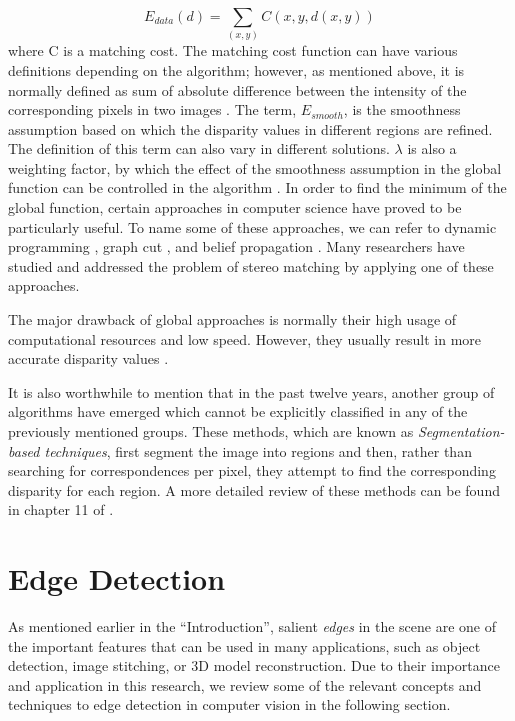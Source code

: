 \begin{equation}
E_{data}(d) = \sum_{(x,y)}C(x,y,d(x,y))
\end{equation}
\noindent
where C is a matching cost. The matching cost function can have various definitions depending on the algorithm; however, as mentioned above, it is normally defined as sum of absolute difference 
between the intensity of the corresponding pixels in two images \cite{sch02}. \newline
The term, $E_{smooth}$, is the smoothness assumption based on which the disparity values in different regions are refined. The definition of this term can also vary in 
different solutions. $\lambda$ is also a weighting factor, by which the effect of the smoothness assumption in the global function can be controlled in the algorithm \cite{sze11}.
In order to find the minimum of the global function, certain approaches in computer science have proved to be particularly useful. 
To name some of these approaches, we can refer to dynamic programming \cite{kim05}, graph cut \cite{boy01,boyk01,boy04}, and belief propagation \cite{sun11}. 
Many researchers have studied and addressed the problem of stereo matching
by applying one of these approaches.

The major drawback of global approaches is normally their high usage of computational resources and low speed. However, 
they usually result in more accurate disparity values \cite{hirsch02,sze11}. 

It is also worthwhile to mention that in the past twelve years, another group of algorithms have emerged which cannot be explicitly classified in any of the previously mentioned groups.
These methods, which are known as {\it Segmentation-based techniques}, first segment the image into regions and then, rather than searching for correspondences per pixel,
they attempt to find the corresponding disparity for each region. A more detailed review of these methods can be found in chapter 11 of \cite{sze11}.

\section{Edge Detection}

As mentioned earlier in the ``Introduction'', salient {\it edges} in the scene are one of the important features 
that can be used in many applications, such as object detection, image stitching, or 3D model reconstruction.
Due to their importance and application in this research, we review some of the relevant concepts and techniques to edge detection
in computer vision in the following section.

